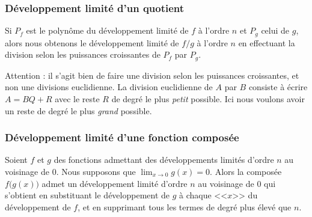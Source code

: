 \newcommand{\CaptionFigWUYooCISzeB}{Les développements limités d'ordre de plus en plus grand de la fonction de l'exemple~\ref{ExKPBooJmdFvY}. La fonction est en bleu et les «approximations» sont en rouge.}


\subsubsection{Développement limité d'un quotient}

\begin{proposition}     \label{PROPooMANAooXhuanS}
    Si \( P_f\) est le polynôme du développement limité de \( f\) à l'ordre \( n\) et \( P_g\) celui de \( g\), alors nous obtenons le développement limité de \( f/g\) à l'ordre \( n\) en effectuant la division selon les puissances croissantes de \( P_f\) par \( P_g\).
\end{proposition}
Attention : il s'agit bien de faire une division selon les puissances croissantes, et non une divisions euclidienne. La division euclidienne de \( A\) par \( B\) consiste à écrire \( A=BQ+R\) avec le reste \( R\) de degré le plus \emph{petit} possible. Ici nous voulons avoir un reste de degré le plus \emph{grand} possible.

\subsubsection{Développement limité d'une fonction composée}


\begin{proposition}
    Soient \( f\) et \( g\) des fonctions admettant des développements limités d'ordre $n$ au voisinage de $0$. Nous supposons que \( \lim_{x\to 0} g(x)=0\). Alors la composée \( f\big( g(x) \big)\) admet un développement limité d'ordre $n$ au voisinage de $0$ qui s'obtient en substituant le développement de \( g\) à chaque <<\(x \)>> du développement de \( f\), et en supprimant tous les termes de degré plus élevé que $n$.
\end{proposition}

